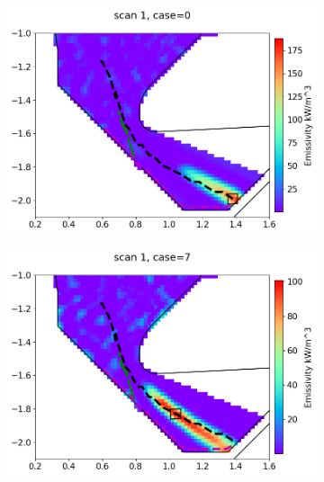 \begin{figure}
     \begin{subfigure}{0.32\linewidth}
         \centering
         \includegraphics[trim={0 0 25 35},clip,width=\textwidth]{Chapters/chapter2/figs/phantom_example1.png}
         \caption{}
         \label{fig:scan1a}
     \end{subfigure}
     \hfill
     \begin{subfigure}{0.32\linewidth}
         \centering
         \includegraphics[trim={0 0 25 35},clip,width=\textwidth]{Chapters/chapter2/figs/phantom_example2.png}
         \caption{}
         \label{fig:scan1b}
     \end{subfigure}
     \hfill
     \begin{subfigure}{0.33\linewidth}

\end{subfigure}
\end{figure}
